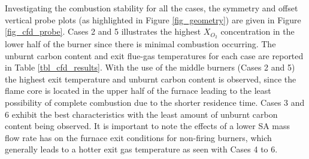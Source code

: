 \documentclass[review]{elsarticle}
\begin{document}
Investigating the combustion stability for all the cases, the symmetry and offset vertical probe plots (as highlighted in Figure \ref{fig_geometry}) are given in Figure \ref{fig_cfd_probe}. Cases 2 and 5 illustrates the highest $X_{O_{2}}$ concentration in the lower half of the burner since there is minimal combustion occurring. The unburnt carbon content and exit flue-gas temperatures for each case are reported in Table \ref{tbl_cfd_results}. With the use of the middle burners (Cases 2 and 5) the highest exit temperature and unburnt carbon content is observed, since the flame core is located in the upper half of the furnace leading to the least possibility of complete combustion due to the shorter residence time. Cases 3 and 6 exhibit the best characteristics with the least amount of unburnt carbon content being observed. It is important to note the effects of a lower SA mass flow rate has on the furnace exit conditions for non-firing burners, which generally leads to a hotter exit gas temperature as seen with Cases 4 to 6. 
\end{document}
